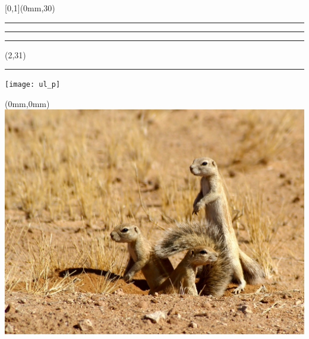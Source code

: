 
\begingroup
{}
\textblockorigin{0mm}{0mm}
\setlength{\parindent}{0mm}
\setlength{\imageheight}{29\TPVertModule}
\setlength{\banderougewidth}{2\TPHorizModule}
\setlength{\banderougeheight}{\TPVertModule}
\setlength{\bandeorwidth}{\TPHorizModule}
\setlength{\bandeorheight}{\banderougeheight}
\setlength{\logoheight}{2.5\TPVertModule}
\setlength{\gapwidth}{1.5pt}
\addtolength{\bandeorwidth}{-\gapwidth}
\addtolength{\imageheight}{-\gapwidth}
\setlength{\fboxrule}{3pt}
\setlength{\fboxsep}{0pt}

\def\titlefmt{%
  \sffamily\bfseries\fontsize{52}{52}\selectfont\thetitle}
\def\authorfmt{%
  \sffamily\mdseries\fontsize{30}{38}\selectfont\theauthor}
\def\affiliation{%
  \sffamily\mdseries\fontsize{22}{26}\selectfont
  Professeur titulaire \\
  École d'actuariat, Université Laval}
\def\edition{%
  \sffamily\mdseries\fontsize{22}{26}\selectfont
  Édition {\fullcaps\year}.\month}

\begin{textblock*}{\paperwidth}[0,1](0mm,30\TPVertModule)
  \textcolor{rouge}{\rule{\banderougewidth}{\banderougeheight}}%
  \rule{\gapwidth}{0pt}%
  \textcolor{or}{\rule{\bandeorwidth}{\bandeorheight}}           %
\end{textblock*}

\begin{textblock*}{\TPHorizModule}(2\TPHorizModule,31\TPVertModule)
  \rule{\gapwidth}{0pt}%
  \texttt{[image: ul\_p]}
\end{textblock*}

\begin{textblock*}{\paperwidth}(0mm,0mm)
  \includegraphics[height=\imageheight,%
                   width=\paperwidth,%
                   trim=555 185 251 0,clip]{Xerus_inauris_1}
\end{textblock*}

